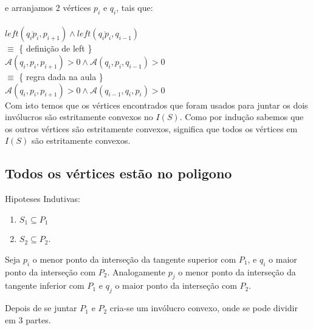 \documentclass[11pt]{article}
\begin{document}
e arranjamos 2 vértices $p_i$ e $q_i$, tais que:\\
\\
$left(\overline{q_i p_i}, p_{i+1}) \wedge left(\overline{q_i p_i}, q_{i-1})$\\
$\equiv$ \{ definição de left \}\\
$\mathcal{A}(q_i, p_i, p_{i+1}) > 0 \wedge \mathcal{A}(q_i, p_i, q_{i-1}) > 0$\\
$\equiv$ \{ regra dada na aula \}\\
$\mathcal{A}(q_i, p_i, p_{i+1}) > 0 \wedge \mathcal{A}(q_{i-1}, q_i, p_i) > 0$\\

Com isto temos que os vértices encontrados que foram 
usados para juntar os dois invólucros são estritamente
convexos no $I(S)$. Como por indução sabemos que os 
outros vértices são estritamente convexos, significa
que todos os vértices em $I(S)$ são estritamente convexos.


\subsection{Todos os vértices estão no poligono}
Hipoteses Indutivas:
\begin{enumerate}
    \item $S_1 \subseteq P_1$ 
    \item $S_2 \subseteq P_2$.
\end{enumerate}

Seja $p_i$ o menor ponto da interseção da tangente 
superior com $P_1$, e $q_i$ o maior ponto da interseção com $P_2$.
Analogamente $p_j$ o menor ponto da interseção da tangente 
inferior com $P_1$ e $q_j$ o maior ponto da interseção com $P_2$.

Depois de se juntar $P_1$ e $P_2$ cria-se um invólucro convexo,
onde se pode dividir em 3 partes.
\end{document}
